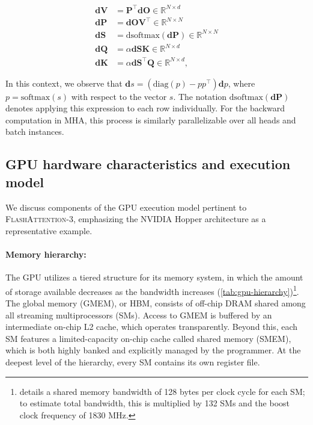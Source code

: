 \begin{align*}
  \mathbf{dV} &= \mathbf{P}^\top \mathbf{dO} \in \mathbb{R}^{N \times d} \\
  \mathbf{dP} &= \mathbf{dO} \mathbf{V}^\top \in \mathbb{R}^{N \times N} \\
  \mathbf{dS} &= \mathrm{dsoftmax} (\mathbf{dP}) \in \mathbb{R}^{N \times N} \\
  \mathbf{dQ} &= \alpha \mathbf{dS} \mathbf{K} \in \mathbb{R}^{N \times d} \\
  \mathbf{dK} &= \alpha \mathbf{dS}^\top \mathbf{Q} \in \mathbb{R}^{N \times d},
\end{align*}

In this context, we observe that $\mathbf{d}s = (\mathrm{diag}(p) - p p^\top)\mathbf{d}p$, where $p = \mathrm{softmax}(s)$ with respect to the vector $s$. The notation $\mathrm{dsoftmax}(\mathbf{dP})$ denotes applying this expression to each row individually. For the backward computation in MHA, this process is similarly parallelizable over all heads and batch instances.

\subsection{GPU hardware characteristics and execution model}
\label{subsec:hardware}

We discuss components of the GPU execution model pertinent to \textsc{FlashAttention-3}, emphasizing the NVIDIA Hopper architecture as a representative example.

\paragraph{Memory hierarchy:} The GPU utilizes a tiered structure for its memory system, in which the amount of storage available decreases as the bandwidth increases (\cref{tab:gpu-hierarchy})\footnote{\citet{luo2024benchmarking} details a shared memory bandwidth of 128 bytes per clock cycle for each SM; to estimate total bandwidth, this is multiplied by 132 SMs and the boost clock frequency of 1830 MHz.}. The global memory (GMEM), or HBM, consists of off-chip DRAM shared among all streaming multiprocessors (SMs). Access to GMEM is buffered by an intermediate on-chip L2 cache, which operates transparently. Beyond this, each SM features a limited-capacity on-chip cache called shared memory (SMEM), which is both highly banked and explicitly managed by the programmer. At the deepest level of the hierarchy, every SM contains its own register file.

